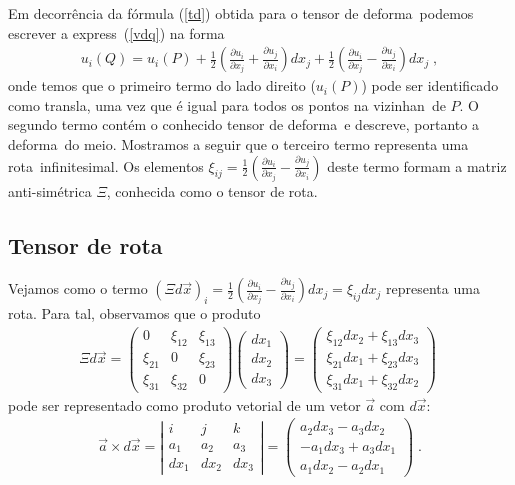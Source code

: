 Em decorr\^encia da f\'ormula (\ref{td}) obtida para o
tensor de deforma\cao\ podemos escrever a express\ao\
(\ref{vdq}) na forma
\begin{eqnarray} \label{vdq2}
u_i(Q) = u_i(P) + \frac{1}{2}\left( \frac{\partial u_i}
{\partial x_j} + \frac{\partial u_j}{\partial x_i}\right)
dx_j + \frac{1}{2}\left( \frac{\partial u_i}{\partial x_j}
- \frac{\partial u_j}{\partial x_i}\right)dx_j \; ,
\end{eqnarray}
onde temos que o primeiro termo do lado direito ($u_i(P)$)
pode ser identificado como transla\cao, uma vez que \'e
igual para todos os pontos na vizinhan\ca\ de $P$. O segundo
termo cont\'em o conhecido tensor de deforma\cao\ e descreve, portanto a
deforma\cao\ do meio. Mostramos a seguir que
o terceiro termo  representa uma rota\cao\ infinitesimal.
Os elementos $\xi_{ij} = \frac{1}{2} \left(\frac{\partial u_i}{\partial x_j} -
\frac{\partial u_j}{\partial x_i}\right)$ deste termo formam a matriz
anti-sim\'etrica $\Xi$, conhecida como o tensor de rota\cao.

\subsection{Tensor de rota\cao}

Vejamos como o termo $\left( \Xi d\vec{x} \right)_i=
\frac{1}{2} \left( \frac{\partial u_i}{\partial x_j} -
\frac{\partial u_j}{\partial x_i}\right) dx_j = \xi_{ij}
dx_j$ representa uma rota\cao.
Para tal, observamos que o produto
\begin{eqnarray}
\Xi d\vec{x} = \left(
\begin{array}{ccc}
0 & \xi_{12} & \xi_{13} \\
\xi_{21} & 0 & \xi_{23} \\
\xi_{31} & \xi_{32} & 0
\end{array} \right)
\left(
\begin{array}{c}
dx_1 \\
dx_2 \\
dx_3
\end{array} \right)
= \left(
\begin{array}{c}
\xi_{12} dx_2 + \xi_{13} dx_3 \\
\xi_{21} dx_1 + \xi_{23} dx_3 \\
\xi_{31} dx_1 + \xi_{32} dx_2
\end{array}
\right) \;
  \label{eq:chidx}
\end{eqnarray}
pode ser representado como produto vetorial de um vetor
$\vec{a}$  com $d\vec{x}$:
\begin{eqnarray}
\vec{a} \times d\vec{x} = \left|
\begin{array}{ccc}
i & j & k \\
a_1 & a_2 & a_3 \\
dx_1 & dx_2 & dx_3
\end{array} \right|
= \left(
\begin{array}{c}
a_2 dx_3 - a_3 dx_2 \\
-a_1 dx_3 + a_3 dx_1 \\
a_1 dx_2 - a_2 dx_1
\end{array}
\right) \; .
  \label{eq:arotdx}
\end{eqnarray}

